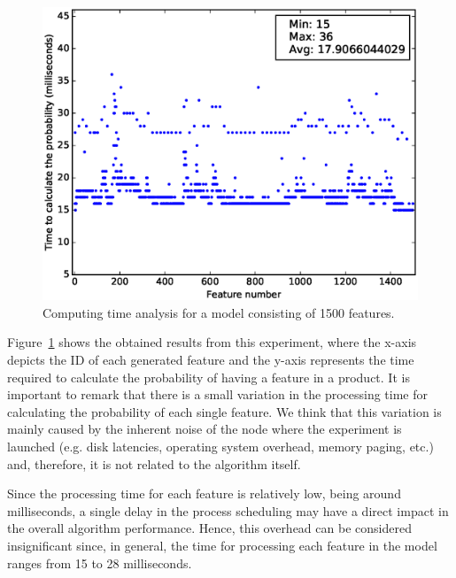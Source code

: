 \begin{figure}[h]
        \centering
        \linefigure
        \includegraphics[width=0.8\hsize,angle=0]{plot_probs_times.eps}
        \linefigure
        \caption{Computing time analysis for a model consisting of 1500 features.}\label{fig:plot:probs:times}
\end{figure}

Figure~\ref{fig:plot:probs:times} shows the obtained results from this experiment, where the x-axis depicts the ID of each generated feature and the y-axis represents the time required to calculate the probability of having a feature in a product.
It is important to remark that there is a small variation in the processing time for calculating the probability of each single feature. We think that this variation is mainly caused by the inherent noise of the node where the experiment is launched (e.g. disk latencies, operating
system overhead, memory paging, etc.) and, therefore, it is not related to the algorithm itself.

Since the processing time for each feature is relatively low, being around milliseconds, a single delay in
the process scheduling may have a direct impact in the overall algorithm performance. Hence, this overhead
can be considered insignificant since, in general, the time for processing each feature in the model ranges
from 15 to 28 milliseconds.

